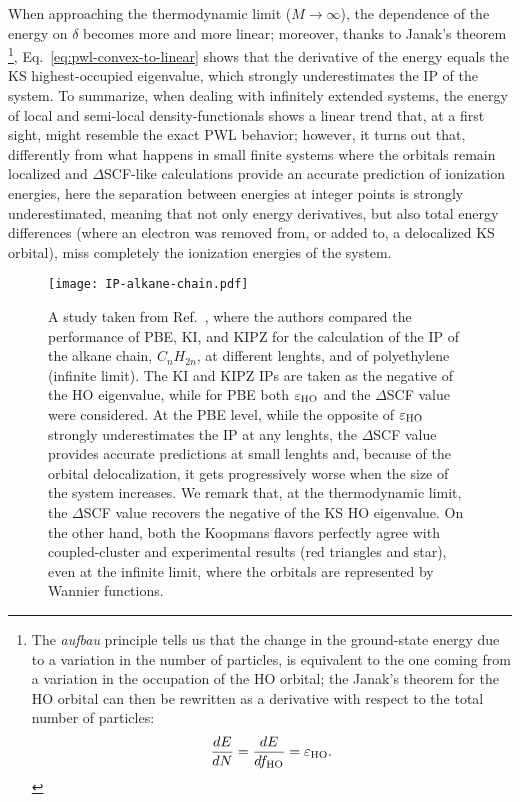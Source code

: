%
When approaching the thermodynamic limit ($M\longrightarrow \infty$), the dependence of the energy on $\delta$ becomes more and more linear; moreover, thanks to Janak's theorem
\footnote{The \emph{aufbau} principle tells us that the change in the ground-state energy due to a variation in the number of particles, is equivalent to the one coming from a variation in the occupation of the HO orbital; the Janak's theorem for the HO orbital can then be rewritten as a derivative with respect to the total number of particles:
\begin{equation*}
    \frac{dE}{dN} = \frac{dE}{df_{\rm HO}} = \varepsilon_{\rm HO} .
\end{equation*}
}, 
Eq.~\eqref{eq:pwl-convex-to-linear} shows that the derivative of the energy equals the KS highest-occupied eigenvalue, which strongly underestimates the IP of the system. To summarize, when dealing with infinitely extended systems, the energy of local and semi-local density-functionals shows a linear trend that, at a first sight, might resemble the exact PWL behavior; however, it turns out that, differently from what happens in small finite systems where the orbitals remain localized and $\Delta$SCF-like calculations provide an accurate prediction of ionization energies, here the separation between energies at integer points is strongly underestimated, meaning that not only energy derivatives, but also total energy differences (where an electron was removed from, or added to, a delocalized KS orbital), miss completely the ionization energies of the system.

\begin{figure}
    \centering
    \texttt{[image: IP-alkane-chain.pdf]}
    \caption[PBE, KI, and KIPZ IPs for the alkane chain.]{A study taken from Ref.~\cite{nguyen_koopmans-compliant_2018}, where the authors compared the performance of PBE, KI, and KIPZ for the calculation of the IP of the alkane chain, $C_n H_{2n}$, at different lenghts, and of polyethylene (infinite limit). The KI and KIPZ IPs are taken as the negative of the HO eigenvalue, while for PBE both $\varepsilon_{\rm HO}$ and the $\Delta$SCF value were considered. At the PBE level, while the opposite of $\varepsilon_{\rm HO}$ strongly underestimates the IP at any lenghts, the $\Delta$SCF value provides accurate predictions at small lenghts and, because of the orbital delocalization, it gets progressively worse when the size of the system increases. We remark that, at the thermodynamic limit, the $\Delta$SCF value recovers the negative of the KS HO eigenvalue. On the other hand, both the Koopmans flavors perfectly agree with coupled-cluster and experimental results (red triangles and star), even at the infinite limit, where the orbitals are represented by Wannier functions.}
    \label{fig:ip-alkane-chain}
\end{figure}

